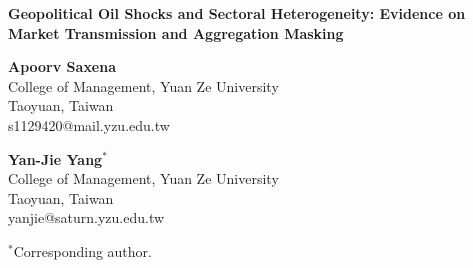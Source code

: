 \documentclass[12pt]{article}
\begin{document}
\begin{center}
{\Large\textbf{Geopolitical Oil Shocks and Sectoral Heterogeneity: Evidence on Market Transmission and Aggregation Masking}}

\vspace{1.5cm}

\textbf{Apoorv Saxena}\\
College of Management, Yuan Ze University\\
Taoyuan, Taiwan\\
s1129420@mail.yzu.edu.tw

\vspace{0.8cm}

\textbf{Yan-Jie Yang}$^{*}$\\
College of Management, Yuan Ze University\\
Taoyuan, Taiwan\\
yanjie@saturn.yzu.edu.tw

\vspace{0.8cm}

$^{*}$Corresponding author.

\end{center}
\end{document}
